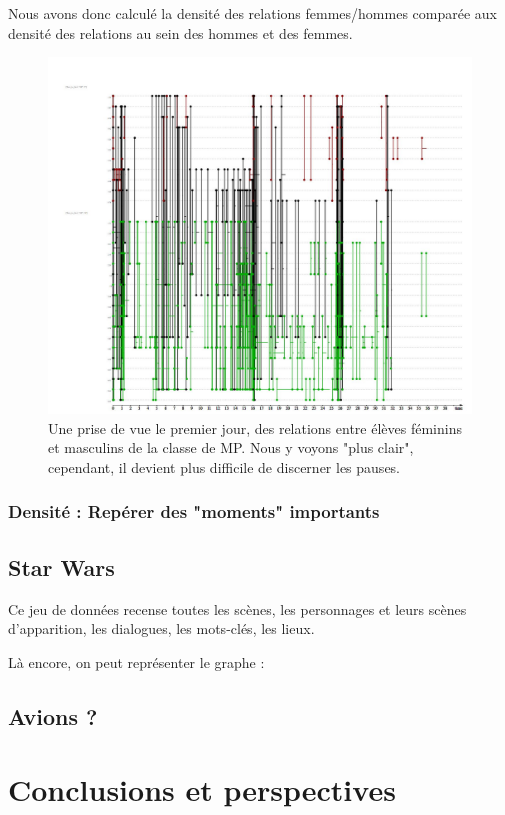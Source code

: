 \documentclass[11pt,a4paper]{article}
\theoremstyle{definition}
\theoremstyle{remark}
\theoremstyle{remark}
\begin{document}
Nous avons donc calculé la densité des relations femmes/hommes comparée aux densité des relations au sein des hommes et des femmes.







\begin{figure}
	\includegraphics[width=\textwidth]{1jourMP.JPG}
	\caption{Une prise de vue le premier jour, des relations entre élèves féminins et masculins de la classe de MP. Nous y voyons "plus clair", cependant, il devient plus difficile de discerner les pauses.}
\end{figure}




\subsubsection{Densité : Repérer des "moments" importants}

\subsection{Star Wars}

Ce jeu de données recense toutes les scènes, les personnages et leurs scènes d'apparition, les dialogues, les mots-clés, les lieux.

Là encore, on peut représenter le graphe : 

\subsection{Avions ?}

\section{Conclusions et perspectives}

    \nocite{*}
    
	
\end{document}
